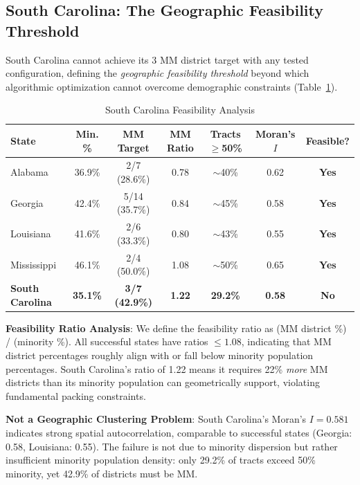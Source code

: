 \subsection{South Carolina: The Geographic Feasibility Threshold}

South Carolina cannot achieve its 3 MM district target with any tested configuration, defining the \emph{geographic feasibility threshold} beyond which algorithmic optimization cannot overcome demographic constraints (Table~\ref{tab:sc-feasibility}).

\begin{table}[htbp]
\centering
\caption{South Carolina Feasibility Analysis}
\label{tab:sc-feasibility}
\begin{tabular}{lcccccc}
\toprule
\textbf{State} & \textbf{Min. \%} & \textbf{MM Target} & \textbf{MM Ratio} & \textbf{Tracts $\geq$50\%} & \textbf{Moran's $I$} & \textbf{Feasible?} \\
\midrule
Alabama        & 36.9\% & 2/7 (28.6\%) & 0.78 & $\sim$40\% & 0.62 & \textbf{Yes} \\
Georgia        & 42.4\% & 5/14 (35.7\%) & 0.84 & $\sim$45\% & 0.58 & \textbf{Yes} \\
Louisiana      & 41.6\% & 2/6 (33.3\%) & 0.80 & $\sim$43\% & 0.55 & \textbf{Yes} \\
Mississippi    & 46.1\% & 2/4 (50.0\%) & 1.08 & $\sim$50\% & 0.65 & \textbf{Yes} \\
\textbf{South Carolina} & \textbf{35.1\%} & \textbf{3/7 (42.9\%)} & \textbf{1.22} & \textbf{29.2\%} & \textbf{0.58} & \textbf{No} \\
\bottomrule
\end{tabular}
\end{table}

\textbf{Feasibility Ratio Analysis}: We define the feasibility ratio as (MM district \%) / (minority \%). All successful states have ratios $\leq 1.08$, indicating that MM district percentages roughly align with or fall below minority population percentages. South Carolina's ratio of 1.22 means it requires 22\% \emph{more} MM districts than its minority population can geometrically support, violating fundamental packing constraints.

\textbf{Not a Geographic Clustering Problem}: South Carolina's Moran's $I = 0.581$ indicates strong spatial autocorrelation, comparable to successful states (Georgia: 0.58, Louisiana: 0.55). The failure is not due to minority dispersion but rather insufficient minority population density: only 29.2\% of tracts exceed 50\% minority, yet 42.9\% of districts must be MM.

